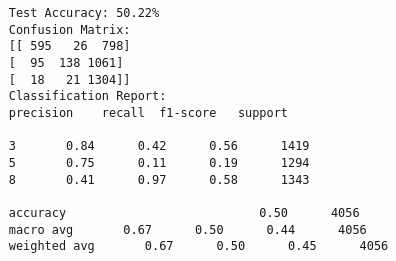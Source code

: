 \documentclass[letterpaper]{article}
\begin{document}
	\begin{minipage}{\linewidth}
	\begin{Verbatim}
     Test Accuracy: 50.22%
     Confusion Matrix:
     [[ 595   26  798]
     [  95  138 1061]
     [  18   21 1304]]
     Classification Report:
     precision    recall  f1-score   support
     
     3       0.84      0.42      0.56      1419
     5       0.75      0.11      0.19      1294
     8       0.41      0.97      0.58      1343
     
     accuracy                           0.50      4056
     macro avg       0.67      0.50      0.44      4056
     weighted avg       0.67      0.50      0.45      4056
	\end{Verbatim}
\end{minipage}
\end{document}
